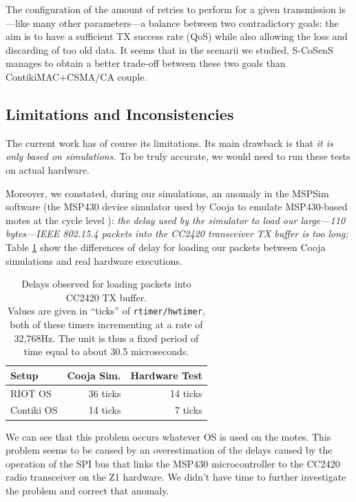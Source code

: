 \documentclass[a4paper,twoside]{article}
\begin{document}
The configuration of the amount of retries to perform for a given
transmission is---like many other parameters---a balance between two
contradictory goals: the aim is to have a sufficient TX success rate (QoS)
while also allowing the loss and discarding of too old data. It seems
that in the scenarii we studied, S-CoSenS manages to obtain a better
trade-off between these two goals than ContikiMAC+CSMA/CA couple.



\subsection{Limitations and Inconsistencies}
\label{SectLimits}

The current work has of course its limitations. Its main drawback is that
\emph{it is only based on simulations.} To be truly accurate, we would need
to run these tests on actual hardware.

Moreover, we constated, during our simulations, an anomaly in the MSPSim
software (the MSP430 device simulator used by Cooja to emulate MSP430-based
motes at the cycle level \cite{MSPSim}): \emph{the delay used by the
simulator to load our large---110 bytes---IEEE 802.15.4 packets into
the CC2420 transceiver TX buffer is too long;} Table \ref{TblTXPktLoadDelays}
show the differences of delay for loading our packets between
Cooja simulations and real hardware executions.

\begin{table}
\centering
\begin{tabular}{|l|r|r|}
\hline
Setup     &  Cooja Sim.  & Hardware Test \\
\hline
RIOT OS    &   36 ticks  &  14 ticks \\ 
Contiki OS &   14 ticks  &   7 ticks \\
\hline
\end{tabular}
\caption{Delays observed for loading packets into CC2420 TX buffer.\\
Values are given in ``ticks'' of \texttt{rtimer/hwtimer}, both of these
timers incrementing at a rate of 32,768Hz. The unit is thus a fixed period
of time equal to about 30.5 microseconds.}
\label{TblTXPktLoadDelays}
\end{table}

We can see that this problem occurs whatever OS is used on the motes.
This problem seems to be caused by an overestimation of the delays caused
by the operation of the SPI bus that links the MSP430 microcontroller
to the CC2420 radio transceiver on the Z1 hardware. We didn't have time
to further investigate the problem and correct that anomaly.
\end{document}
